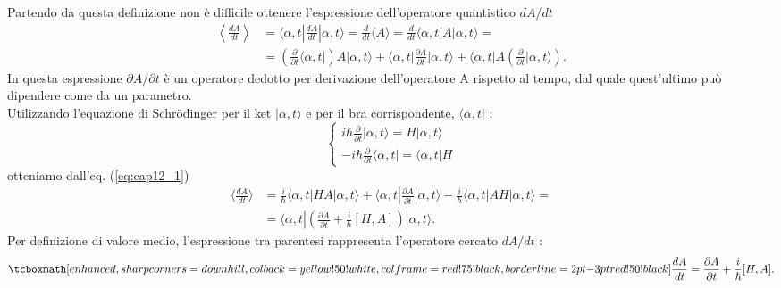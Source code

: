 \documentclass[a4paper,12pt,oneside]{book}
\begin{document}
Partendo da questa definizione non è difficile ottenere l'espressione dell'operatore quantistico $dA/dt$
	\begin{align}
	\label{eq:cap12_1}
	\left\langle \frac{dA}{dt} \right\rangle &= \langle \alpha,t| \frac{dA}{dt}| \alpha,t \rangle = \frac{d}{dt} \langle A \rangle = \frac{d}{dt} \langle \alpha ,t |A| \alpha ,t\rangle= \nonumber\\
	&=\left(\frac{\partial }{\partial{t}}\langle \alpha,t|\right) A|\alpha,t \rangle + \langle \alpha,t| \frac{\partial A}{\partial{t}}|\alpha,t \rangle + \langle\alpha,t|A \left(\frac{\partial }{\partial{t}}|\alpha,t\rangle\right).
	\end{align} 
In questa espressione ${\partial A}/{\partial{t}}$ è un operatore dedotto per derivazione dell'operatore A rispetto al tempo, dal quale quest'ultimo può dipendere come da un parametro.\\

Utilizzando l'equazione di Schr\"{o}dinger per il ket $|\alpha,t\rangle$ e per il bra corrispondente,   $\langle\alpha,t|$ :
	\begin{equation}
		\begin{cases}
		\displaystyle{i\hbar\frac{\partial }{\partial{t}}|\alpha,t\rangle= H|\alpha,t\rangle }\\[0.3cm]
	\displaystyle{-i\hbar\frac{\partial }{\partial{t}}\langle\alpha,t|= \langle\alpha,t|H } 
		\end{cases}
	\end{equation}
otteniamo dall'eq. (\ref{eq:cap12_1})
	\begin{align}
		\langle\frac{dA}{dt} \rangle &= \frac{i}{\hbar} \langle\alpha,t|HA|\alpha,t\rangle + \langle \alpha,t|\frac{\partial A}{\partial{t}}|\alpha,t \rangle -\frac{i}{\hbar} \langle \alpha,t|AH|\alpha,t\rangle=  \nonumber\\
		&= \langle \alpha,t| (\frac{\partial A}{\partial{t}} + \frac{i}{\hbar}[H,A] ) |\alpha,t\rangle .
	\end{align}
Per definizione di valore medio, l'espressione tra parentesi rappresenta l'operatore cercato $dA/dt$ :
	\begin{equation}
	\label{eq:cap12_2}
		\tcboxmath[enhanced, sharp corners=downhill, colback=yellow!50!white, colframe=red!75!black, borderline={2pt}{-3pt}{red!50!black}]{
			\frac{dA}{dt}= \frac{\partial A}{\partial{t}}+ \frac{i}{\hbar}[H,A].
			}
	\end{equation}\\
\end{document}
